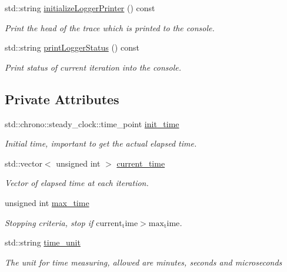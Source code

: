 \begin{DoxyCompactItemize}
std\+::string \mbox{\hyperlink{classlogger_1_1_logger_time_a3b3c55f2ff14363a93f9ac0a2e23e1df}{initialize\+Logger\+Printer}} () const
\begin{DoxyCompactList}\small\item\em Print the head of the trace which is printed to the console. \end{DoxyCompactList}\item 
std\+::string \mbox{\hyperlink{classlogger_1_1_logger_time_a22bef2a992b88689d7748c4017e17d19}{print\+Logger\+Status}} () const
\begin{DoxyCompactList}\small\item\em Print status of current iteration into the console. \end{DoxyCompactList}\end{DoxyCompactItemize}
\subsection*{Private Attributes}
\begin{DoxyCompactItemize}
\item 
std\+::chrono\+::steady\+\_\+clock\+::time\+\_\+point \mbox{\hyperlink{classlogger_1_1_logger_time_ace1b159544a0120633c506d36e0d22e0}{init\+\_\+time}}
\begin{DoxyCompactList}\small\item\em Initial time, important to get the actual elapsed time. \end{DoxyCompactList}\item 
std\+::vector$<$ unsigned int $>$ \mbox{\hyperlink{classlogger_1_1_logger_time_a9c26fbdef41cacef1e7f630839f3a4d2}{current\+\_\+time}}
\begin{DoxyCompactList}\small\item\em Vector of elapsed time at each iteration. \end{DoxyCompactList}\item 
unsigned int \mbox{\hyperlink{classlogger_1_1_logger_time_a1aec07a58b6d91c7931e627fc25018ff}{max\+\_\+time}}
\begin{DoxyCompactList}\small\item\em Stopping criteria, stop if $\mathrm{current_time} > \mathrm{max_time}$. \end{DoxyCompactList}\item 
std\+::string \mbox{\hyperlink{classlogger_1_1_logger_time_a98bc56e547f8f32a3db03907347335da}{time\+\_\+unit}}
\begin{DoxyCompactList}\small\item\em The unit for time measuring, allowed are {\ttfamily minutes}, {\ttfamily seconds} and {\ttfamily microseconds} \end{DoxyCompactList}\end{DoxyCompactItemize}
